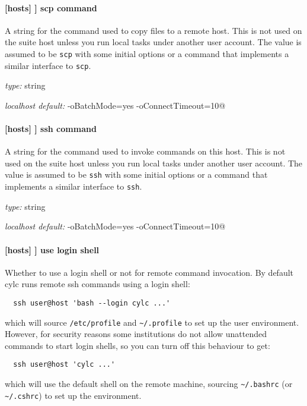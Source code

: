 \paragraph[scp command]{[hosts] \textrightarrow [[HOST]] \textrightarrow scp command }

A string for the command used to copy files to a remote host. This is not used
on the suite host unless you run local tasks under another user account. The
value is assumed to be \lstinline=scp= with some initial options or a command
that implements a similar interface to \lstinline=scp=.


\begin{myitemize}
\item {\em type:} string
\item {\em localhost default:} \lstinline@scp -oBatchMode=yes -oConnectTimeout=10@
\end{myitemize}

\paragraph[ssh command]{[hosts] \textrightarrow [[HOST]] \textrightarrow ssh command }

A string for the command used to invoke commands on this host. This is not
used on the suite host unless you run local tasks under another user account.
The value is assumed to be \lstinline=ssh= with some initial options or a
command that implements a similar interface to \lstinline=ssh=.

\begin{myitemize}
\item {\em type:} string
\item {\em localhost default:} \lstinline@ssh -oBatchMode=yes -oConnectTimeout=10@
\end{myitemize}

\paragraph[use login shell]{[hosts] \textrightarrow [[HOST]] \textrightarrow use login shell }

Whether to use a login shell or not for remote command invocation. By
default cylc runs remote ssh commands using a login shell:
\begin{lstlisting}
  ssh user@host 'bash --login cylc ...'
\end{lstlisting}
which will source \lstinline=/etc/profile= and
\lstinline=~/.profile= to set up the user environment.  However, for
security reasons some institutions do not allow unattended commands to
start login shells, so you can turn off this behaviour to get:
\begin{lstlisting}
  ssh user@host 'cylc ...'
\end{lstlisting}
which will use the default shell on the remote machine,
sourcing \lstinline=~/.bashrc= (or \lstinline=~/.cshrc=) to set up the
environment.

